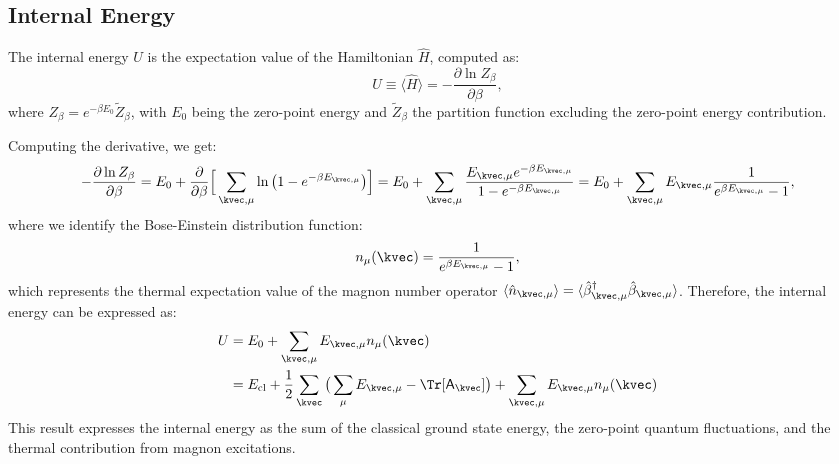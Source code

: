 \subsection{Internal Energy}\label{subsec: Internal Energy}
The internal energy $U$ is the expectation value of the Hamiltonian $\hat{H}$, computed as:
\begin{equation}
    U \equiv \langle \hat{H} \rangle  = -\frac{\partial \ln Z_{\beta}}{\partial \beta},
\end{equation}
where $Z_{\beta} = e^{- \beta E_{0}} \tilde{Z}_{\beta}$, with $E_0$ being the zero-point energy and $\tilde{Z}_{\beta}$ the partition function excluding the zero-point energy contribution.

Computing the derivative, we get:
\begin{equation}
     - \frac{\partial \ln Z_{\beta}}{\partial \beta} 
    = E_{0} + \frac{\partial}{\partial \beta} \Big[  \sum_{\kvec, \mu} \ln \big( 1 - e^{- \beta E_{\kvec, \mu}} \big) \Big]
    = E_{0} + \sum_{\kvec, \mu} \frac{E_{\kvec, \mu} e^{-\beta E_{\kvec, \mu}}}{1 - e^{-\beta E_{\kvec, \mu}}}  
    = E_{0} + \sum_{\kvec, \mu} E_{\kvec, \mu} \frac{1}{e^{\beta E_{\kvec, \mu}} - 1},
\end{equation}
where we identify the Bose-Einstein distribution function:
\begin{equation}
    n_{\mu} (\kvec) = \frac{1}{e^{\beta E_{\kvec, \mu}} - 1},
\end{equation}
which represents the thermal expectation value of the magnon number operator $\langle\hat{n}_{\kvec, \mu}\rangle = \langle \hat{\beta}^{\dagger}_{\kvec, \mu} \hat{\beta}_{\kvec,\mu} \rangle$.
Therefore, the internal energy can be expressed as:
\begin{align}
    U &= E_0 + \sum_{\kvec, \mu} E_{\kvec, \mu} n_{\mu} (\kvec) \nonumber \\
    &= E_{\rm cl} + \frac{1}{2} \sum_{\kvec} \big( \sum_{\mu} E_{\kvec, \mu} - \Tr [\mathsf{A}_{\kvec}] \big) + \sum_{\kvec, \mu} E_{\kvec, \mu} n_{\mu}(\kvec)
\end{align}
This result expresses the internal energy as the sum of the classical ground state energy, the zero-point quantum fluctuations, and the thermal contribution from magnon excitations.




